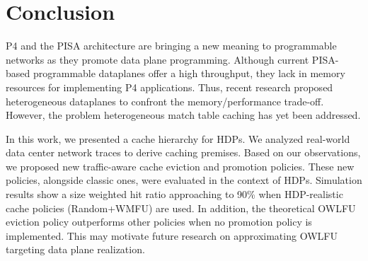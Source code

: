 \section{Conclusion}\label{sec:conclusion}

P4 and the PISA architecture are bringing a new meaning to programmable networks as they promote data plane programming.
Although current PISA-based programmable dataplanes offer a high throughput, they lack in memory resources for implementing P4 applications.
Thus, recent research proposed heterogeneous dataplanes to confront the memory/performance trade-off.
However, the problem heterogeneous match table caching has yet been addressed.

In this work, we presented a cache hierarchy for HDPs.
We analyzed real-world data center network traces to derive caching premises.
Based on our observations, we proposed new traffic-aware cache eviction and promotion policies.
These new policies, alongside classic ones, were evaluated in the context of HDPs.
Simulation results show a size weighted hit ratio approaching to 90\% when HDP-realistic cache policies (Random+WMFU) are used.
In addition, the theoretical OWLFU eviction policy outperforms other policies when no promotion policy is implemented.
This may motivate future research on approximating OWLFU targeting data plane realization. 